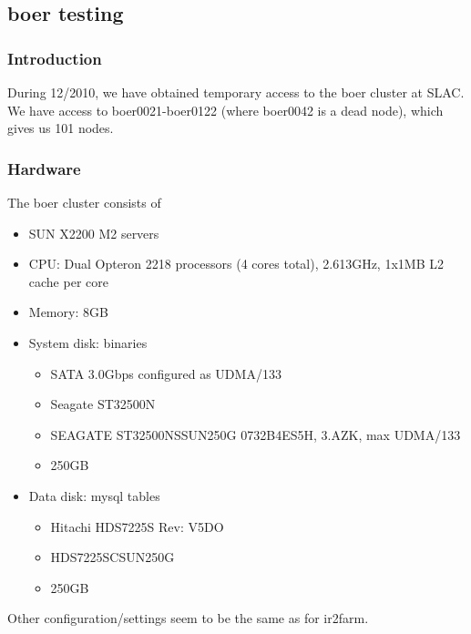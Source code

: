 \documentclass[DM,toc]{lsstdoc}
\begin{document}
\subsection{boer testing}\label{boer-testing}

\subsubsection{Introduction}\label{introduction}

During 12/2010, we have obtained temporary access to the boer cluster at
SLAC. We have access to boer0021-boer0122 (where boer0042 is a dead
node), which gives us 101 nodes.

\subsubsection{Hardware}\label{hardware-boer}

The boer cluster consists of

\begin{itemize}
\item
  SUN X2200 M2 servers
\item
  CPU: Dual Opteron 2218 processors (4 cores total), 2.613GHz, 1x1MB L2
  cache per core
\item
  Memory: 8GB
\item
  System disk: binaries

  \begin{itemize}
  \item
    SATA 3.0Gbps configured as UDMA/133
  \item
    Seagate ST32500N
  \item
    SEAGATE ST32500NSSUN250G 0732B4ES5H, 3.AZK, max UDMA/133
  \item
    250GB
  \end{itemize}
\end{itemize}

\begin{itemize}
\item
  Data disk: mysql tables

  \begin{itemize}
  \item
    Hitachi HDS7225S Rev: V5DO
  \item
    HDS7225SCSUN250G
  \item
    250GB
  \end{itemize}
\end{itemize}

Other configuration/settings seem to be the same as for ir2farm.
\end{document}
